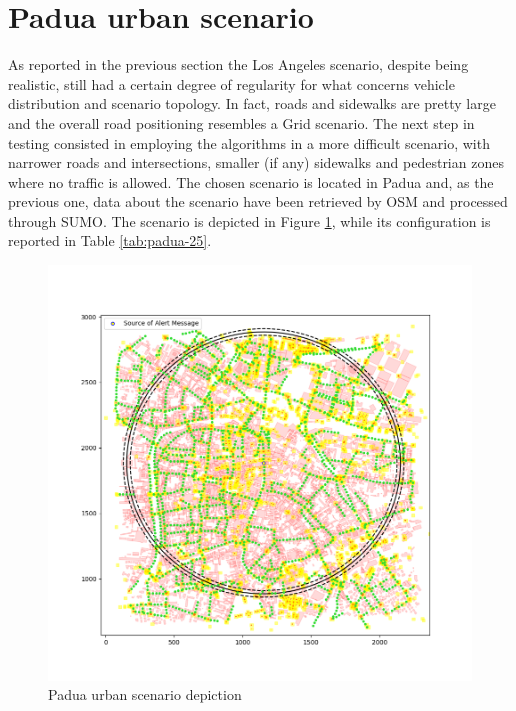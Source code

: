 	\section{Padua urban scenario}
		\label{sec:padua-urban}
		As reported in the previous section the Los Angeles scenario, despite being realistic, still had a certain degree of regularity for what concerns vehicle distribution and scenario topology. In fact, roads and sidewalks are pretty large and the overall road positioning resembles a Grid scenario. The next step in testing consisted in employing the algorithms in a more difficult scenario, with narrower roads and intersections, smaller (if any) sidewalks and pedestrian zones where no traffic is allowed. The chosen scenario is located in Padua and, as the previous one, data about the scenario have been retrieved by OSM and processed through SUMO. The scenario is depicted in Figure \ref{fig:padua-scenario}, while its configuration is reported in Table \ref{tab:padua-25}. 
		
		\begin{figure}[H]
			\centering
			\includegraphics[width=1.0\textwidth]{immagini/padua-25/padua-scenario}
			\caption{Padua urban scenario depiction}
			\label{fig:padua-scenario}
		\end{figure}
	

